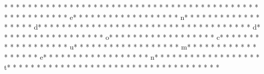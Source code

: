 * * *  * * *  * * *  *  * * *  *  * * *  * %
* * *  * * *  * * *  *  * * *  *  * * *  * 
* * *  * * *  * * *  *  * * *  *  * * *  * e* * *  * * *  * * *  *  * * *  *  * * *  * n* * *  * * *  * * *  *  * * *  *  * * *  * d* * *  * * *  * * *  *  * * *  *  * * *  * {* * *  * * *  * * *  *  * * *  *  * * *  * d* * *  * * *  * * *  *  * * *  *  * * *  * o* * *  * * *  * * *  *  * * *  *  * * *  * c* * *  * * *  * * *  *  * * *  *  * * *  * u* * *  * * *  * * *  *  * * *  *  * * *  * m* * *  * * *  * * *  *  * * *  *  * * *  * e* * *  * * *  * * *  *  * * *  *  * * *  * n* * *  * * *  * * *  *  * * *  *  * * *  * t* * *  * * *  * * *  *  * * *  *  * * *  * }* * *  * * *  * * *  *  * * *  *  * * *  * 
